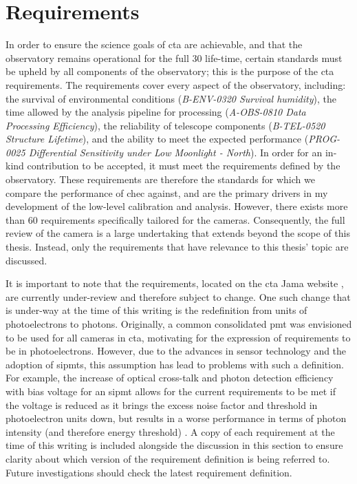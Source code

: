 \section{Requirements}

In order to ensure the science goals of \gls{cta} are achievable, and that the observatory remains operational for the full 30 life-time, certain standards must be upheld by all components of the observatory; this is the purpose of the \gls{cta} requirements. The requirements cover every aspect of the observatory, including: the survival of environmental conditions (\textit{B-ENV-0320 Survival humidity}), the time allowed by the analysis pipeline for processing (\textit{A-OBS-0810 Data Processing Efficiency}), the reliability of telescope components (\textit{B-TEL-0520 Structure Lifetime}), and the ability to meet the expected performance (\textit{PROG-0025 Differential Sensitivity under Low Moonlight - North}). In order for an in-kind contribution to be accepted, it must meet the requirements defined by the observatory. These requirements are therefore the standards for which we compare the performance of \gls{chec} against, and are the primary drivers in my development of the low-level calibration and analysis. However, there exists more than 60 requirements specifically tailored for the cameras. Consequently, the full review of the camera is a large undertaking that extends beyond the scope of this thesis. Instead, only the requirements that have relevance to this thesis' topic are discussed.

It is important to note that the requirements, located on the \gls{cta} Jama website \cite{cta-jama}, are currently under-review and therefore subject to change. One such change that is under-way at the time of this writing is the redefinition from units of photoelectrons to photons. Originally, a common consolidated \gls{pmt} was envisioned to be used for all cameras in \gls{cta}, motivating for the expression of requirements to be in photoelectrons. However, due to the advances in sensor technology and the adoption of \glspl{sipmt}, this assumption has lead to problems with such a definition. For example, the increase of optical cross-talk and photon detection efficiency with bias voltage for an \gls{sipmt} allows for the current requirements to be met if the voltage is reduced as it brings the excess noise factor and threshold in photoelectron units down, but results in a worse performance in terms of photon intensity (and therefore energy threshold) \cite{petophotons}. A copy of each requirement at the time of this writing is included alongside the discussion in this section to ensure clarity about which version of the requirement definition is being referred to. Future investigations should check the latest requirement definition. \vfill


